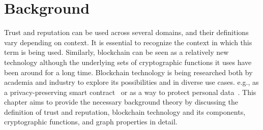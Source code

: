 \chapter{Background} \label{ch:background}
Trust and reputation can be used across several domains, and their definitions
vary depending on context. It is essential to recognize the context in which
this term is being used. Similarly, blockchain can be seen as a relatively new
technology although the underlying sets of cryptographic functions it uses have
been around for a long time. Blockchain technology is being researched both by
academia and industry to explore its possibilities and in diverse use cases.
e.g., as a privacy-preserving smart contract~\cite{kosba2016hawk} or as a way
to protect personal data~\cite{zyskind2015decentralizing}. This chapter aims to
provide the necessary background theory by discussing the definition of trust
and reputation, blockchain technology and its components, cryptographic
functions, and graph properties in detail. 
